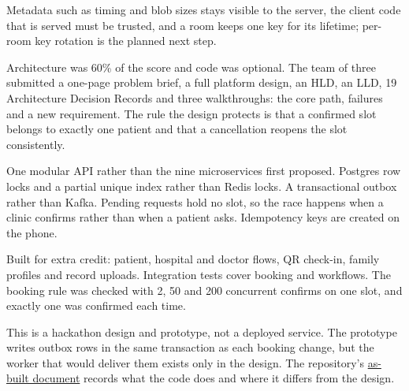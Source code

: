  Metadata such as timing and blob sizes stays visible to the
server, the client code that is served must be trusted, and a room keeps one key for its lifetime;
per-room key rotation is the planned next step.


\begin{facts}
\end{facts}

 Architecture was 60\% of the score and code was optional. The team of three
submitted a one-page problem brief, a full platform design, an HLD, an LLD, 19 Architecture Decision
Records and three walkthroughs: the core path, failures and a new requirement. The rule the design
protects is that a confirmed slot belongs to exactly one patient and that a cancellation reopens the
slot consistently.

 One modular API rather than the nine microservices first proposed. Postgres row
locks and a partial unique index rather than Redis locks. A transactional outbox rather than Kafka.
Pending requests hold no slot, so the race happens when a clinic confirms rather than when a patient
asks. Idempotency keys are created on the phone.

 Built for extra credit: patient, hospital and doctor flows, QR check-in, family
profiles and record uploads. Integration tests cover booking and workflows. The booking rule was
checked with 2, 50 and 200 concurrent confirms on one slot, and exactly one was confirmed each time.

 This is a hackathon design and prototype, not a deployed
service. The prototype writes outbox rows in the same transaction as each booking change, but the
worker that would deliver them exists only in the design. The repository's
\href{https://github.com/KartikJain14/mal-hackathon/blob/main/docs/architecture/as-built.md}{as-built
document} records what the code does and where it differs from the design.

